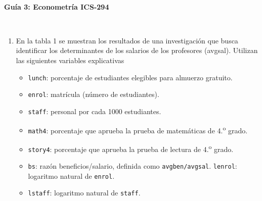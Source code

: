 \documentclass[12pt]{article}
\begin{document}
\vspace{5cm}



\begin{center}
\begin{large}
\textbf{\\Guía 3: Econometría ICS-294}
\end{large}\\
\end{center}

\begin{enumerate}
   
\item 
En la tabla 1  se muestran los resultados de una investigación que busca identificar los determinantes de los salarios de los profesores (avgsal).  Utilizan las siguientes variables explicativas 

\begin{itemize}
   \item \texttt{lunch}: porcentaje de estudiantes elegibles para almuerzo gratuito.
  \item \texttt{enrol}: matrícula (número de estudiantes).
  \item \texttt{staff}: personal por cada 1000 estudiantes.
 
  \item \texttt{math4}: porcentaje que aprueba la prueba de matemáticas de 4.\textsuperscript{o} grado.
  \item \texttt{story4}: porcentaje que aprueba la prueba de lectura de 4.\textsuperscript{o} grado.
  \item \texttt{bs}: razón beneficios/salario, definida como \texttt{avgben/avgsal}.
 \texttt{lenrol}: logaritmo natural de \texttt{enrol}.
  \item \texttt{lstaff}: logaritmo natural de \texttt{staff}.
\end{itemize}

\begin{table}[H] \centering 
  \caption{Salarios de los profesores}  \label{tabla_reg}%


\end{table}
\end{enumerate}
\end{document}
